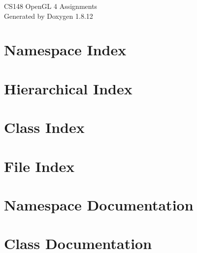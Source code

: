 \documentclass[twoside]{book}
\newcommand{\+}{\discretionary{\mbox{\scriptsize$\hookleftarrow$}}{}{}}
\newcommand{\clearemptydoublepage}{%
  \newpage{\pagestyle{empty}\cleardoublepage}%
}
\begin{document}
\hypersetup{pageanchor=false,
             bookmarksnumbered=true,
             pdfencoding=unicode
            }
\begin{titlepage}
\vspace*{7cm}
\begin{center}%
{\Large C\+S148 Open\+GL 4 Assignments }\\
\vspace*{1cm}
{\large Generated by Doxygen 1.8.12}\\
\end{center}
\end{titlepage}
\clearemptydoublepage
{}
\tableofcontents
\clearemptydoublepage
{}
\hypersetup{pageanchor=true}

\chapter{Namespace Index}

\chapter{Hierarchical Index}

\chapter{Class Index}

\chapter{File Index}

\chapter{Namespace Documentation}



\chapter{Class Documentation}























\end{document}

